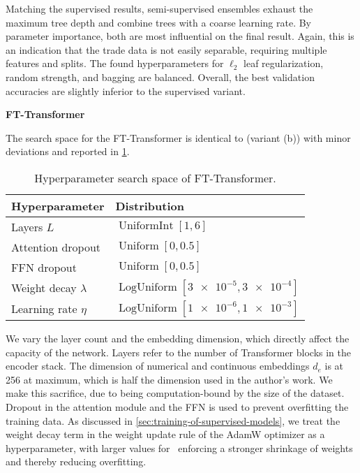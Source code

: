 Matching the supervised results, semi-supervised ensembles exhaust the maximum tree depth and combine trees with a coarse learning rate. By parameter importance, both are most influential on the final result. Again, this is an indication that the trade data is not easily separable, requiring multiple features and splits. The found hyperparameters for $\ell_2$ leaf regularization, random strength, and bagging are balanced. Overall, the best validation accuracies are slightly inferior to the supervised variant.

\clearpage

\textbf{FT-Transformer}

The search space for the FT-Transformer is identical to \textcite[\checkmark][18950]{gorishniyRevisitingDeepLearning2021} (variant (b)) with minor deviations and reported in \cref{tab:hyperparameter-space-2}.

\begin{table}[!h]
    \centering
    \caption[Hyperparameter Search Space of FT-Transformer]{Hyperparameter search space of FT-Transformer.}
    \label{tab:hyperparameter-space-2}
    \begin{tabular}{@{}ll@{}}
        \toprule
        Hyperparameter         & Distribution                                        \\ \midrule
        Layers $L$             & $\operatorname{UniformInt}[1,6]$                    \\
        Attention dropout      & $\operatorname{Uniform}[0, 0.5]$                    \\
        \gls{FFN} dropout      & $\operatorname{Uniform}[0, 0.5]$                    \\
        Weight decay $\lambda$ & $\operatorname{LogUniform}[\num{3e-5}, \num{3e-4}]$ \\
        Learning rate $\eta$   & $\operatorname{LogUniform}[\num{1e-6}, \num{1e-3}]$ \\ \bottomrule
    \end{tabular}
\end{table}

We vary the layer count and the embedding dimension, which directly affect the capacity of the network. Layers refer to the number of Transformer blocks in the encoder stack. The dimension of numerical and continuous embeddings $d_e$ is at \num{256} at maximum, which is half the dimension used in the author's work. We make this sacrifice, due to being computation-bound by the size of the dataset. Dropout in the attention module and the \gls{FFN} is used to prevent overfitting the training data. As discussed in \cref{sec:training-of-supervised-models}, we treat the weight decay term in the weight update rule of the AdamW optimizer as a hyperparameter, with larger values for \lambda~enforcing a stronger shrinkage of weights and thereby reducing overfitting.

